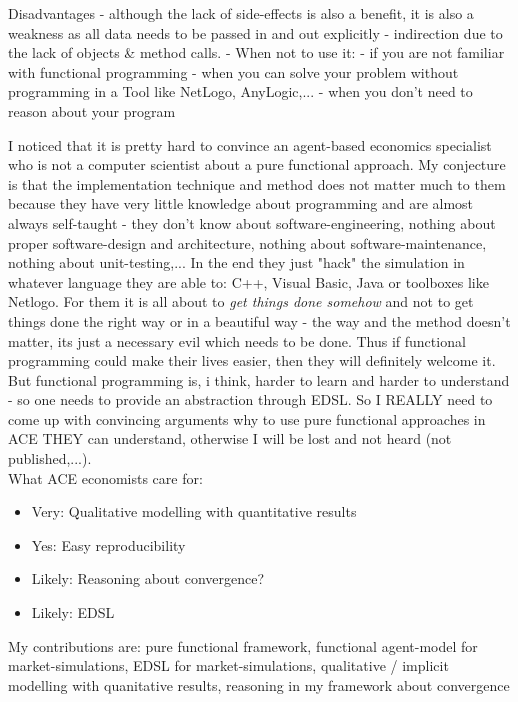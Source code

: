Disadvantages
- although the lack of side-effects is also a benefit, it is also a weakness as all data needs to be passed in and out explicitly 
- indirection due to the lack of objects \& method calls.
- When not to use it: 
	- if you are not familiar with functional programming
	- when you can solve your problem without programming in a Tool like NetLogo, AnyLogic,...
	- when you don't need to reason about your program
	
I noticed that it is pretty hard to convince an agent-based economics specialist who is not a computer scientist about a pure functional approach. My conjecture is that the implementation technique and method does not matter much to them because they have very little knowledge about programming and are almost always self-taught - they don't know about software-engineering, nothing about proper software-design and architecture, nothing about software-maintenance, nothing about unit-testing,... In the end they just "hack" the simulation in whatever language they are able to: C++, Visual Basic, Java or toolboxes like Netlogo. For them it is all about to \textit{get things done somehow} and not to get things done the right way or in a beautiful way - the way and the method doesn't matter, its just a necessary evil which needs to be done. Thus if functional programming could make their lives easier, then they will definitely welcome it. But functional programming is, i think, harder to learn and harder to understand - so one needs to provide an abstraction through EDSL. So I REALLY need to come up with convincing arguments why to use pure functional approaches in ACE THEY can understand, otherwise I will be lost and not heard (not published,...). \\

What ACE economists care for:

\begin{itemize}
\item Very: Qualitative modelling with quantitative results
\item Yes: Easy reproducibility
\item Likely: Reasoning about convergence?
\item Likely: EDSL
\end{itemize}

My contributions are: pure functional framework, functional agent-model for market-simulations, EDSL for market-simulations, qualitative / implicit modelling with quanitative results, reasoning in my framework about convergence \\


